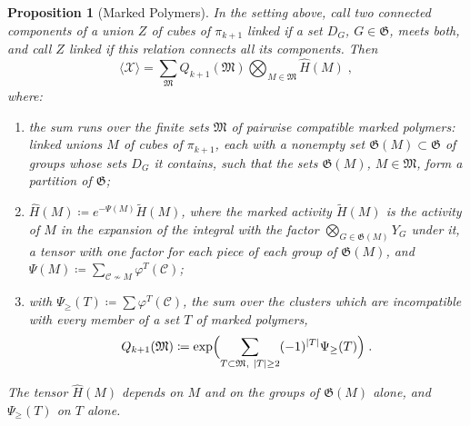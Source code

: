 \documentclass[11pt]{preprint}
\DeclarePairedDelimiter{\abs}{\lvert}{\rvert}
\numberwithin{equation}{section}
\newtheorem{proposition}[theorem]{Proposition}
\theoremstyle{definition}
\theoremstyle{remark}
\theoremstyle{plain}
\begin{document}
\begin{proposition}[Marked Polymers]\label{prop:marked-polymers}
In the setting above, call two connected components of a union $Z$ of cubes of $\pi_{k+1}$ \emph{linked} if a set $D_G$, $G \in \mathfrak G$, meets both, and call $Z$ linked if this relation connects all its components. Then
\begin{equation}\label{eq:marked-expansion}
    \langle\mathcal X\rangle = \sum_{\mathfrak M}Q_{k+1}(\mathfrak M)\bigotimes_{M \in \mathfrak M}\hat H(M)\;,
\end{equation}
where:
\begin{enumerate}[label=(\roman*)]
\item the sum runs over the finite sets $\mathfrak M$ of pairwise compatible \emph{marked polymers}: linked unions $M$ of cubes of $\pi_{k+1}$, each with a nonempty set $\mathfrak G(M) \subset \mathfrak G$ of groups whose sets $D_G$ it contains, such that the sets $\mathfrak G(M)$, $M \in \mathfrak M$, form a partition of $\mathfrak G$;
\item $\hat H(M) \coloneqq e^{-\Psi(M)}\tilde H(M)$, where the \emph{marked activity} $\tilde H(M)$ is the activity of $M$ in the expansion \cite[(2.1)--(2.11)]{BalabanRG2} of the integral with the factor $\bigotimes_{G \in \mathfrak G(M)}Y_G$ under it, a tensor with one factor for each piece of each group of $\mathfrak G(M)$, and $\Psi(M) \coloneqq \sum_{\mathcal C \not\sim M}\varphi^T(\mathcal C)$;
\item with $\Psi_{\geq}(T) \coloneqq \sum\varphi^T(\mathcal C)$, the sum over the clusters which are incompatible with every member of a set $T$ of marked polymers,
\begin{equation}\label{eq:vacuum-interaction}
    Q_{k+1}(\mathfrak M) \coloneqq \exp\Bigl(\sum_{T \subset \mathfrak M,\ \abs T \geq 2}(-1)^{\abs T}\Psi_{\geq}(T)\Bigr)\;.
\end{equation}
\end{enumerate}
The tensor $\hat H(M)$ depends on $M$ and on the groups of $\mathfrak G(M)$ alone, and $\Psi_{\geq}(T)$ on $T$ alone.
\end{proposition}
\end{document}
